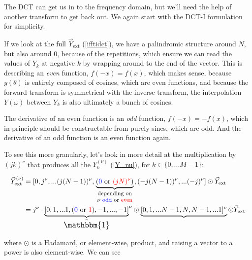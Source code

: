 \documentclass[10pt]{article}
\begin{document}
The DCT can get us in to the frequency domain, but we'll need the help of another transform to get back out. We again start with the DCT-I formulation for simplicity.

If we look at the full $\vec{Y}_{\text{ext}}$ (\autoref{ifftidct}), we have a palindromic structure around $N$, but also around $0$, because of \href{https://dsp.stackexchange.com/a/18931/40873}{the repetitions}\cite{bristow}, which ensure we can read the values of $Y_k$ at negative $k$ by wrapping around to the end of the vector. This is describing an \textit{even} function, $f(-x) = f(x)$, which makes sense, because $y(\theta)$ is entirely composed of cosines, which are even functions, and because the forward transform is symmetrical with the inverse transform, the interpolation $Y(\omega)$ between $Y_k$ is also ultimately a bunch of cosines.

The derivative of an even function is an \textit{odd} function, $f(-x) = -f(x)$, which in principle should be constructable from purely sines, which are odd. And the derivative of an odd function is an even function again.

To see this more granularly, let's look in more detail at the multiplication by $(jk)^\nu$ that produces all the $Y_k^{(\nu)}$ (\autoref{Y_nu}), for $k \in \{0, ... M-1\}$:\vspace{-3mm}

\begin{align*}
\vec{Y}_{\text{ext}}^{(\nu)} &= [0, j^\nu, ... (j(N-1))^\nu, \underbrace{(\color{blue}0\color{black} \text{ or } \color{red}(jN)^\nu\color{black})}_{\parbox{20mm}{\footnotesize \centering depending on $\nu$ \color{blue}odd \color{black} or \color{red}even}}, (-j(N-1))^\nu, ... (-j)^\nu] \odot \vec{Y}_{\text{ext}}\\
&= j^\nu \cdot {\underbrace{[0, 1, ... 1, (\color{blue}0 \color{black}\text{ or }\color{red} 1\color{black}), -1, ..., -1]}_{\text{\large $\tilde{\mathbbm{1}}$}}}^\nu \odot \underbrace{[0, 1, ... N-1, N, N-1, ... 1]^\nu} \odot \vec{Y}_{\text{ext}}
\end{align*}

where $\odot$ is a Hadamard, or element-wise, product, and raising a vector to a power is also element-wise. We can see
\end{document}
